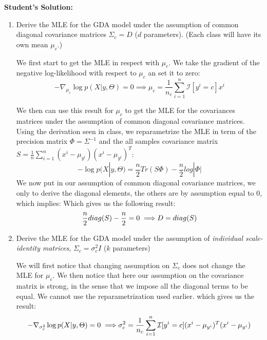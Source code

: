 \documentclass{article}
\begin{document}
\textbf{Student's Solution:}
\begin{enumerate}
\item Derive the MLE for the GDA model under the assumption of common diagonal covariance matrices $\Sigma_c = D$ ($d$ parameters). (Each class will have its own mean $\mu_c$.)
  
 We first start to get the MLE in respect with $\mu_c$. We take the gradient of the negative log-likelihood with respect to $\mu_c$ an set it to zero:
 \[ - \nabla_{\mu_c} \log p(X|y,\Theta)  = 0 \implies \mu_c= \frac{1}{n_c}\sum_{i=1}^n \mathcal{I}[y^i=c] x^i \]

 We then can use this result for $\mu_c$ to get the MLE for the covariances matrices under the assumption of common diagonal covariance matrices. Using the derivation seen in class, we reparametrize the MLE in term of the precision matrix $\Phi = \Sigma^{-1}$ and the all samples covariance matrix $S = \frac{1}{n} \sum_{i=1}^n (x^i - \mu_{y^i})(x^i - \mu_{y^i})^T$:
 \[- \log p(X|y,\Theta)  = \frac{n}{2} Tr(S \Phi) - \frac{n}{2} log|\Phi| \]
 We now put in our assumption of common diagonal covariance matrices, we only to derive the diagonal elements, the others are by assumption equal to 0, which implies:
 Which gives us the following result:
 \[
 \frac{n}{2} diag(S) - \frac{n}{2} = 0 \implies \\
 D = diag(S)
 \]

\item Derive the MLE for the GDA model under the assumption of \emph{individual scale-identity matrices}, $\Sigma_c = \sigma_c^2 I$ ($k$ parameters)
 
 We will first notice that changing assumption on $\Sigma_c$ does not change the MLE for $\mu_c$.
 We then notice that here our assumption on the covariance matrix is strong, in the sense that we impose all the diagonal terms to be equal. We cannot use the reparametrization used earlier.
 which gives us the result:
  \[
 - \nabla_{\sigma_c^2} \log p(X|y,\Theta) = 0 \implies \\
 \sigma_c^2 = \frac{1}{n_c} \sum_{i=1}^n \mathcal{I}[y^i=c] (x^i - \mu_{y^i})^T(x^i - \mu_{y^i})
 \]


\end{enumerate}
\end{document}
